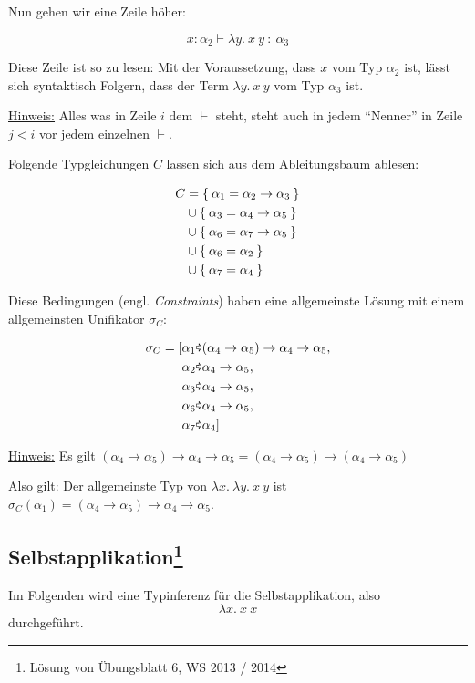 Nun gehen wir eine Zeile höher:

\[x:\alpha_2 \vdash \lambda y.\ x\ y\ :\ \alpha_3\]

Diese Zeile ist so zu lesen: Mit der Voraussetzung, dass $x$ vom Typ $\alpha_2$
ist, lässt sich syntaktisch Folgern, dass der Term $\lambda y.\ x\ y$ vom
Typ $\alpha_3$ ist.

\underline{Hinweis:} Alles was in Zeile $i$ dem $\vdash$ steht, steht auch in
jedem \enquote{Nenner} in Zeile $j < i$ vor jedem einzelnen $\vdash$.

Folgende Typgleichungen $C$ lassen sich aus dem Ableitungsbaum ablesen:

\begin{align*}
	C &= \Set{\alpha_1 = \alpha_2 \rightarrow \alpha_3}\\
	  &\cup \Set{\alpha_3 = \alpha_4 \rightarrow \alpha_5}\\
	  &\cup \Set{\alpha_6 = \alpha_7 \rightarrow \alpha_5}\\
	  &\cup \Set{\alpha_6 = \alpha_2}\\
	  &\cup \Set{\alpha_7 = \alpha_4}
\end{align*}

Diese Bedingungen (engl. \textit{Constraints}) haben eine
allgemeinste Lösung mit einem allgemeinsten Unifikator $\sigma_C$:

\begin{align*}
	\sigma_C = [&\alpha_1 \Parr (\alpha_4 \rightarrow \alpha_5) \rightarrow \alpha_4 \rightarrow \alpha_5,\\
	&\alpha_2 \Parr \alpha_4 \rightarrow \alpha_5,\\
	&\alpha_3 \Parr \alpha_4 \rightarrow \alpha_5,\\
	&\alpha_6 \Parr \alpha_4 \rightarrow \alpha_5,\\
	&\alpha_7 \Parr \alpha_4]
\end{align*}

\underline{Hinweis:} Es gilt $(\alpha_4 \rightarrow \alpha_5) \rightarrow \alpha_4 \rightarrow \alpha_5 = (\alpha_4 \rightarrow \alpha_5) \rightarrow (\alpha_4 \rightarrow \alpha_5)$

Also gilt: Der allgemeinste Typ von $\lambda x.\ \lambda y.\ x\ y$ ist $\sigma_C (\alpha_1) = (\alpha_4 \rightarrow \alpha_5) \rightarrow \alpha_4 \rightarrow \alpha_5$.

\subsection[Selbstapplikation]{Selbstapplikation\footnote{Lösung von Übungsblatt 6, WS 2013 / 2014}}
Im Folgenden wird eine Typinferenz für die Selbstapplikation, also
\[\lambda x.\ x\ x\]
durchgeführt.

